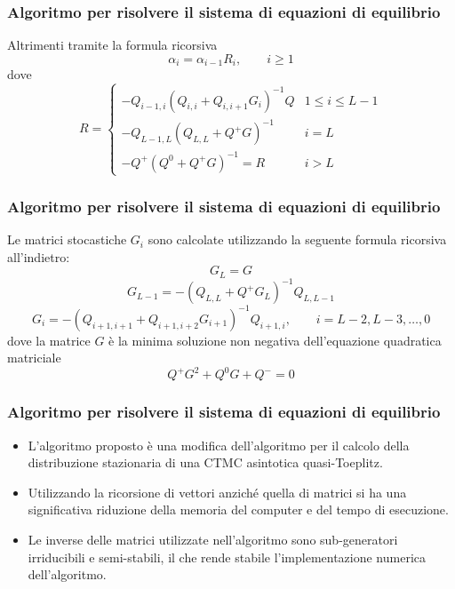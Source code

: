 \documentclass{beamer}
\begin{document}
\begin{frame}
    \frametitle{Algoritmo per risolvere il sistema di equazioni di equilibrio}
    \begin{theorem}
        Altrimenti tramite la formula ricorsiva
        \begin{equation*}\label{eq:rec-alpha}
            \alpha_i = \alpha_{i-1} R_i, \qquad i \geq 1
        \end{equation*}
        dove
        \begin{equation*}
            R =
            \begin{cases}
                -Q_{i-1,i}(Q_{i,i} + Q_{i,i+1}G_i)^{-1}Q & 1 \leq i \leq L-1 \\
                -Q_{L-1,L}(Q_{L,L} + Q^+G)^{-1} & i = L \\
                -Q^+(Q^0 + Q^+G)^{-1} = R & i>L
            \end{cases}
        \end{equation*}
    \end{theorem}
\end{frame}


\begin{frame}
    \frametitle{Algoritmo per risolvere il sistema di equazioni di equilibrio}
    \begin{theorem}
        Le matrici stocastiche $G_i$ sono calcolate utilizzando la seguente formula ricorsiva all'indietro:
            $$G_L = G$$
            $$G_{L-1} = -(Q_{L,L} + Q^+G_L)^{-1}Q_{L,L-1}$$
            $$G_i = -(Q_{i+1,i+1} + Q_{i+1,i+2}G_{i+1})^{-1}Q_{i+1,i}, \qquad i = L-2, L-3, \dots, 0$$
        dove la matrice $G$ è la minima soluzione non negativa dell'equazione quadratica matriciale
        \begin{equation*}
            Q^+G^2 + Q^0G + Q^- = 0
        \end{equation*}
    \end{theorem}
\end{frame}


\begin{frame}
    \frametitle{Algoritmo per risolvere il sistema di equazioni di equilibrio}
    \begin{itemize}
        \item L'algoritmo proposto è una modifica dell'algoritmo per il calcolo della distribuzione stazionaria di una CTMC asintotica quasi-Toeplitz.
        \item Utilizzando la ricorsione di vettori anziché quella di matrici si ha una significativa riduzione della memoria del computer e del tempo di esecuzione.
        \item Le inverse delle matrici utilizzate nell'algoritmo sono sub-generatori irriducibili e semi-stabili, il che rende stabile l'implementazione numerica dell'algoritmo.
    \end{itemize}
\end{frame}
\end{document}
